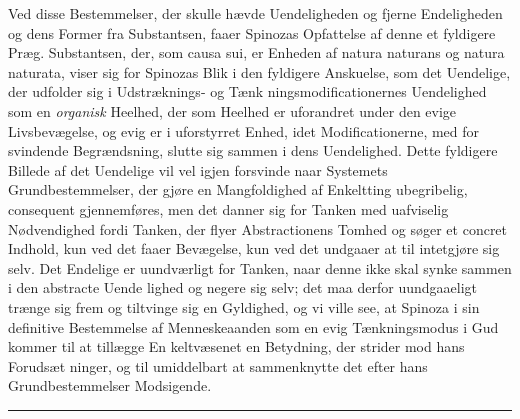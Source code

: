 \documentclass[12pt,a4paper]{book}
\newcommand{\divrule}{\begin{center}\rule{2cm}{0.4pt}\end{center}}
\begin{document}
Ved disse Bestemmelser, der skulle hævde Uendeligheden
og fjerne Endeligheden og dens Former fra Substantsen, faaer
Spinozas Opfattelse af denne et fyldigere Præg. Substantsen,
der, som causa sui, er Enheden af natura naturans og natura
naturata, viser sig for Spinozas Blik i den fyldigere Anskuelse,
som det Uendelige, der udfolder sig i Udstræknings- og Tænk\-%
ningsmodificationernes Uendelighed som en \emph{organisk} Heelhed,
der som Heelhed er uforandret under den evige Livsbevægelse,
og evig er i uforstyrret Enhed, idet Modificationerne, med for\-%
svindende Begrændsning, slutte sig sammen i dens Uendelighed.
Dette fyldigere Billede af det Uendelige vil vel igjen forsvinde
naar Systemets Grundbestemmelser, der gjøre en Mangfoldighed
af Enkeltting ubegribelig, consequent gjennemføres, men det
danner sig for Tanken med uafviselig Nødvendighed fordi Tanken,
der flyer Abstractionens Tomhed og søger et concret Indhold,
kun ved det faaer Bevægelse, kun ved det undgaaer at til\-%
intetgjøre sig selv. Det Endelige er uundværligt for Tanken,
naar denne ikke skal synke sammen i den abstracte Uende\-%
lighed og negere sig selv; det maa derfor uundgaaeligt trænge
sig frem og tiltvinge sig en Gyldighed, og vi ville see, at
Spinoza i sin definitive Bestemmelse af Menneskeaanden som
en evig Tænkningsmodus i Gud kommer til at tillægge En\-%
keltvæsenet en Betydning, der strider mod hans Forudsæt\-%
ninger, og til umiddelbart at sammenknytte det efter hans
Grundbestemmelser Modsigende.

\divrule
%
\end{document}
